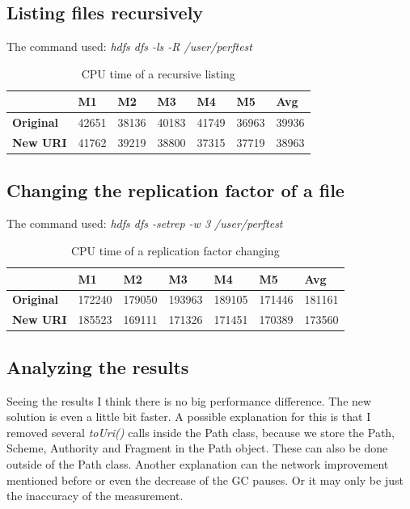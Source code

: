 \subsection{Listing files recursively}
The command used:  \textit{hdfs dfs -ls -R /user/perftest}

\begin{table}[H]
	\begin{tabular}{|l|l|l|l|l|l|l|}
		\hline
		& \textbf{M1} & \textbf{M2} & \textbf{M3} & \textbf{M4} & \textbf{M5} & \textbf{Avg} \\ \hline
		\textbf{Original} & 42651    & 38136    & 40183    & 41749    & 36963    & 39936     \\ \hline
		\textbf{New URI}  & 41762    & 39219    & 38800    & 37315    & 37719    & 38963     \\ \hline
	\end{tabular}
\centering
\caption{CPU time of a recursive listing}
\end{table}
\subsection{Changing the replication factor of a file}
The command used:  \textit{hdfs dfs -setrep -w 3 /user/perftest}

\begin{table}[H]
	\begin{tabular}{|l|l|l|l|l|l|l|}
		\hline
		& \textbf{M1} & \textbf{M2} & \textbf{M3} & \textbf{M4} & \textbf{M5} & \textbf{Avg} \\ \hline
		\textbf{Original} & 172240      & 179050      & 193963      & 189105      & 171446      & 181161       \\ \hline
		\textbf{New URI}  & 185523      & 169111      & 171326      & 171451      & 170389      & 173560       \\ \hline
	\end{tabular}
\centering
\caption{CPU time of a replication factor changing}
\end{table}

\subsection{Analyzing the results}
Seeing the results I think there is no big performance difference. The new solution is even a little bit faster. A possible explanation for this is that I removed several \textit{toUri()} calls inside the Path class, because we store the Path, Scheme, Authority and Fragment in the Path object. These can also be done outside of the Path class. Another explanation can the network improvement mentioned before or even the decrease of the GC pauses. Or it may only be just the inaccuracy of the measurement.

